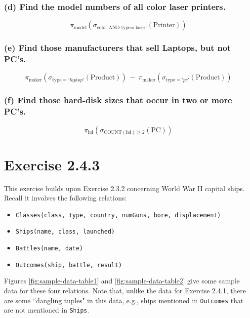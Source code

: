 \documentclass{cshwk}
\begin{document}
\subsubsection*{(d) Find the model numbers of all color laser printers.}

\[
    \pi_{\text{model}} ( \sigma_{\text{color AND type='laser'}} (\text{Printer}) )
\]

\subsubsection*{(e) Find those manufacturers that sell Laptops, but not PC's.}

\[
    \pi_{\text{maker}} ( \sigma_{\text{type} = 'laptop'} (\text{Product}) )
    \ -\
    \pi_{\text{maker}} ( \sigma_{\text{type} = 'pc'} (\text{Product}) )
\]


\subsubsection*{(f) Find those hard-disk sizes that occur in two or more PC's.}
\[
    \pi_{\text{hd}} ( \sigma_{\text{COUNT}(\text{hd}) \geq 2} (\text{PC}) )
\]

\section{Exercise 2.4.3}

This exercise builds upon Exercise 2.3.2 concerning World War II capital ships. Recall it involves the following relations:

\begin{itemize}
    \item \texttt{Classes(class, type, country, numGuns, bore, displacement)}
    \item \texttt{Ships(name, class, launched)}
    \item \texttt{Battles(name, date)}
    \item \texttt{Outcomes(ship, battle, result)}
\end{itemize}

Figures \ref{fig:sample-data-table1} and \ref{fig:sample-data-table2} give some sample data for these four relations. Note that, unlike the data for Exercise 2.4.1, there are some ``dangling tuples" in this data, e.g., ships mentioned in \texttt{Outcomes} that are not mentioned in \texttt{Ships}.
\end{document}
